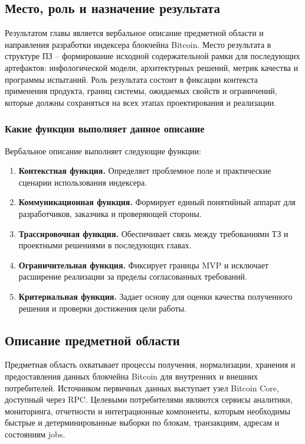 ﻿\documentclass[14pt,a4paper]{extarticle}
\begin{document}
\subsection{Место, роль и назначение результата}
\noindent Результатом главы является вербальное описание предметной области и направления разработки индексера блокчейна Bitcoin. Место результата в структуре ПЗ -- формирование исходной содержательной рамки для последующих артефактов: инфологической модели, архитектурных решений, метрик качества и программы испытаний. Роль результата состоит в фиксации контекста применения продукта, границ системы, ожидаемых свойств и ограничений, которые должны сохраняться на всех этапах проектирования и реализации.

\subsubsection{Какие функции выполняет данное описание}
\noindent Вербальное описание выполняет следующие функции:
\begin{enumerate}
  \item \textbf{Контекстная функция.} Определяет проблемное поле и практические сценарии использования индексера.
  \item \textbf{Коммуникационная функция.} Формирует единый понятийный аппарат для разработчиков, заказчика и проверяющей стороны.
  \item \textbf{Трассировочная функция.} Обеспечивает связь между требованиями ТЗ и проектными решениями в последующих главах.
  \item \textbf{Ограничительная функция.} Фиксирует границы MVP и исключает расширение реализации за пределы согласованных требований.
  \item \textbf{Критериальная функция.} Задает основу для оценки качества полученного решения и проверки достижения цели работы.
\end{enumerate}

\subsection{Описание предметной области}
\noindent Предметная область охватывает процессы получения, нормализации, хранения и предоставления данных блокчейна Bitcoin для внутренних и внешних потребителей. Источником первичных данных выступает узел Bitcoin Core, доступный через RPC. Целевыми потребителями являются сервисы аналитики, мониторинга, отчетности и интеграционные компоненты, которым необходимы быстрые и детерминированные выборки по блокам, транзакциям, адресам и состояниям jobs.
\end{document}
